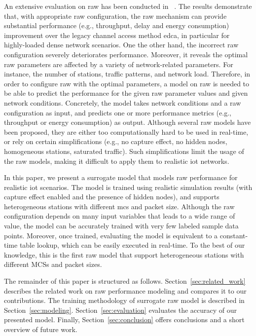 An extensive evaluation on \gls{raw} has been conducted in ~\cite{WoWMoM2016}. The results demonstrate that, with appropriate \gls{raw} configuration, the \gls{raw} mechanism can provide substantial performance (e.g., throughput, delay and energy consumption) improvement over the legacy channel access method \gls{edca}, in particular for highly-loaded dense network scenarios. One the other hand, the incorrect \gls{raw} configuration severely deteriorates performance. Moreover, it reveals the optimal \gls{raw} parameters are affected by a variety of network-related parameters. For instance, the number of stations, traffic patterns, and network load. Therefore, in order to configure \gls{raw} with the optimal parameters, a model on \gls{raw} is needed to be able to predict the performance for the given \gls{raw} parameter values and given network conditions. Concretely, the model takes network conditions and a \gls{raw} configuration as input, and predicts one or more performance metrics (e.g., throughput or energy consumption) as output. Although several \gls{raw} models have been proposed, they are either too computationally hard to be used in real-time, or rely on certain simplifications (e.g., no capture effect, no hidden nodes, homogeneous stations, saturated traffic). Such simplifications limit the usage of the \gls{raw} models, making it difficult to apply them to realistic \gls{iot} networks.

In this paper, we present a surrogate model that models \gls{raw} performance for realistic \gls{iot} scenarios. The model is trained using realistic simulation results (with capture effect enabled and the presence of hidden nodes), and supports heterogeneous stations with different \gls{mcs} and packet size. Although the \gls{raw} configuration depends on many input variables that leads to a wide range of value, the model can be accurately trained with very few labeled sample data points. Moreover, once trained, evaluating the model is equivalent to a constant-time table lookup, which can be easily executed in real-time. To the best of our knowledge, this is the first \gls{raw} model that support heterogeneous stations with different MCSs and packet sizes.


The remainder of this paper is structured as follows. Section~\ref{sec:related_work} describes the  related work on \gls{raw} performance modeling and compares it to our contributions.
The training methodology of surrogate \gls{raw} model is described in Section~\ref{sec:modeling}. Section~\ref{sec:evaluation} evaluates the accuracy of our presented model. Finally, Section~\ref{sec:conclusion} offers conclusions and a short overview of future work.



